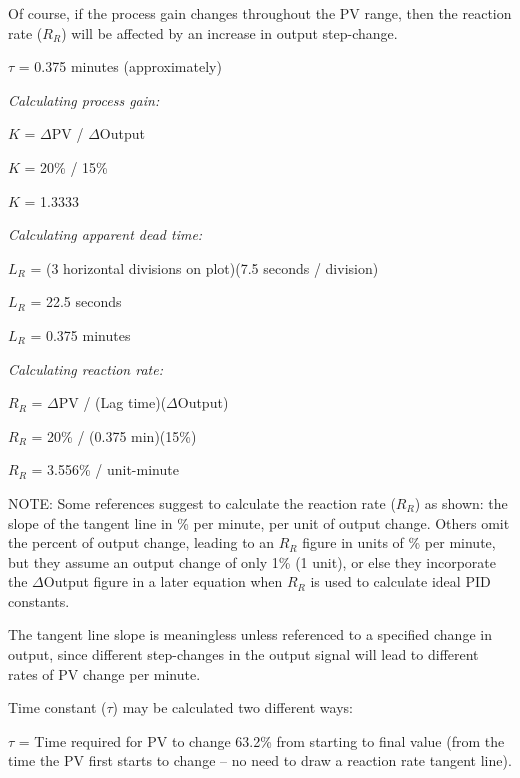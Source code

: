Of course, if the process gain changes throughout the PV range, then the reaction rate ($R_R$) will be affected by an increase in output step-change.

\vskip 10pt

$\tau$ = 0.375 minutes (approximately)







{\it Calculating process gain:}

$K$ = $\Delta$PV / $\Delta$Output

$K$ = 20\% / 15\%

$K$ = 1.3333
 
\vskip 10pt

{\it Calculating apparent dead time:}

$L_R$ = (3 horizontal divisions on plot)(7.5 seconds / division)

$L_R$ = 22.5 seconds

$L_R$ = 0.375 minutes
 
\vskip 10pt
 
{\it Calculating reaction rate:}

$R_R$ = $\Delta$PV / (Lag time)($\Delta$Output)

$R_R$ = 20\% / (0.375 min)(15\%)

$R_R$ = 3.556\% / unit-minute
 
\vskip 10pt
 
NOTE: Some references suggest to calculate the reaction rate ($R_R$) as shown: the slope of the tangent line in \% per minute, per unit of output change.  Others omit the percent of output change, leading to an $R_R$ figure in units of \% per minute, but they assume an output change of only 1\% (1 unit), or else they incorporate the $\Delta$Output figure in a later equation when $R_R$ is used to calculate ideal PID constants.  

The tangent line slope is meaningless unless referenced to a specified change in output, since different step-changes in the output signal will lead to different rates of PV change per minute.

\vskip 10pt


Time constant ($\tau$) may be calculated two different ways:
 
\vskip 10pt

$\tau$ = Time required for PV to change 63.2\% from starting to final value (from the time the PV first starts to change -- no need to draw a reaction rate tangent line).
 
